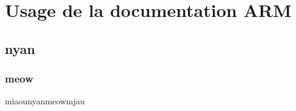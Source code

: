 \section{Usage de la documentation ARM} 
\subsection{nyan} 
\subsubsection{meow} 
miaounyanmeowmjau
